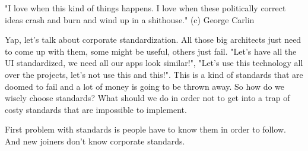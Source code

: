"I love when this kind of things happens. I love when these politically correct ideas crash and burn and wind up in a shithouse." (c) George Carlin

Yap, let's talk about corporate standardization. All those big architects just need to come up with them, some might be useful, others just fail. "Let's have all the UI standardized, we need all our apps look similar!", "Let's use this technology all over the projects, let's not use this and this!". This is a kind of standards that are doomed to fail and a lot of money is going to be thrown away. So how do we wisely choose standards? What should we do in order not to get into a trap of costy standards that are impossible to implement.

First problem with standards is people have to know them in order to follow. And new joiners don't know corporate standards.

